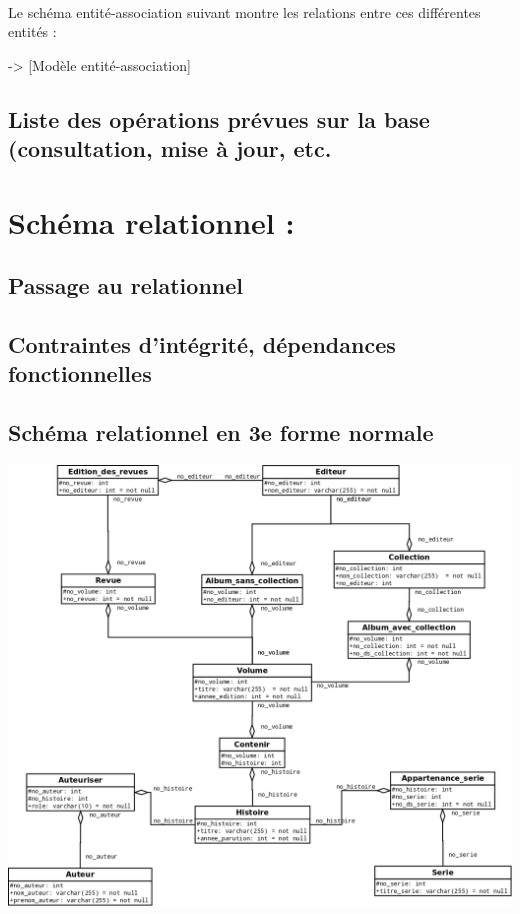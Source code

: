 \documentclass[12pt]{report}
\begin{document}
\paragraph{}
Le schéma entité-association suivant montre les relations entre ces
différentes entités :

-> [Modèle entité-association]

\subsection{Liste des opérations prévues sur la base (consultation, mise à
jour, etc.}

\section{Schéma relationnel :}

\subsection{Passage au relationnel}

\subsection{Contraintes d'intégrité, dépendances fonctionnelles}

\subsection{Schéma relationnel en 3e forme normale}

\noindent\includegraphics[width=\textwidth]{schema-relation}
\end{document}
